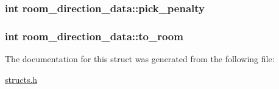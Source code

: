 \hypertarget{structroom__direction__data_a27858fd25c97d5ebb67c6381b0dcd4b6}{
\subsubsection[{pick\-\_\-penalty}]{\setlength{\rightskip}{0pt plus 5cm}int room\-\_\-direction\-\_\-data\-::pick\-\_\-penalty}}\label{structroom__direction__data_a27858fd25c97d5ebb67c6381b0dcd4b6}
\hypertarget{structroom__direction__data_a579f4d62f8f19916d36630ceccdceb1e}{
\subsubsection[{to\-\_\-room}]{\setlength{\rightskip}{0pt plus 5cm}int room\-\_\-direction\-\_\-data\-::to\-\_\-room}}\label{structroom__direction__data_a579f4d62f8f19916d36630ceccdceb1e}


The documentation for this struct was generated from the following file\-:\begin{DoxyCompactItemize}
\item 
\hyperlink{structs_8h}{structs.\-h}\end{DoxyCompactItemize}
